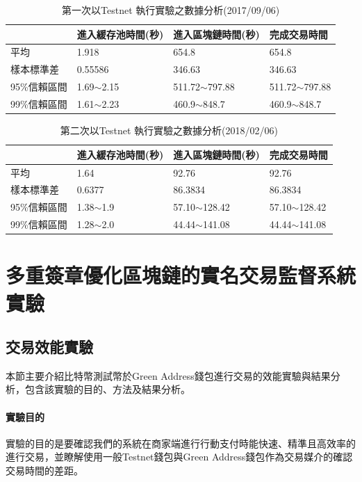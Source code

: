 			\begin{table}[htbp]
			\centering
			\caption{第一次以Testnet 執行實驗之數據分析(2017/09/06)}
			\label{1general}
			\begin{tabular}{|l|l|l|l|}
			\hline
			 & 進入緩存池時間(秒) & 進入區塊鏈時間(秒) & 完成交易時間 \\ \hline
			平均 & 1.918 & 654.8 & 654.8 \\ \hline
			樣本標準差 & 0.55586 & 346.63 & 346.63 \\ \hline
			95\%信賴區間 & 1.69$\sim$2.15 & 511.72$\sim$797.88 & 511.72$\sim$797.88 \\ \hline
			99\%信賴區間 & 1.61$\sim$2.23 & 460.9$\sim$848.7 & 460.9$\sim$848.7 \\ \hline
			\end{tabular}
			\end{table}

			\begin{table}[htbp]
			\centering
			\caption{第二次以Testnet 執行實驗之數據分析(2018/02/06)}
			\label{2general}
			\begin{tabular}{|l|l|l|l|}
			\hline
			 & 進入緩存池時間(秒) & 進入區塊鏈時間(秒) & 完成交易時間 \\ \hline
			平均 & 1.64 & 92.76 & 92.76 \\ \hline
			樣本標準差 & 0.6377 & 86.3834 & 86.3834 \\ \hline
			95\%信賴區間 & 1.38$\sim$1.9 & 57.10$\sim$128.42 & 57.10$\sim$128.42 \\ \hline
			99\%信賴區間 & 1.28$\sim$2.0 & 44.44$\sim$141.08 & 44.44$\sim$141.08 \\ \hline
			\end{tabular}
			\end{table}

		\section{多重簽章優化區塊鏈的實名交易監督系統實驗}
			\subsection{交易效能實驗}
			本節主要介紹比特幣測試幣於Green Address錢包進行交易的效能實驗與結果分析，包含該實驗的目的、方法及結果分析。

				\paragraph{實驗目的}實驗的目的是要確認我們的系統在商家端進行行動支付時能快速、精準且高效率的進行交易，並瞭解使用一般Testnet錢包與Green Address錢包作為交易媒介的確認交易時間的差距。
